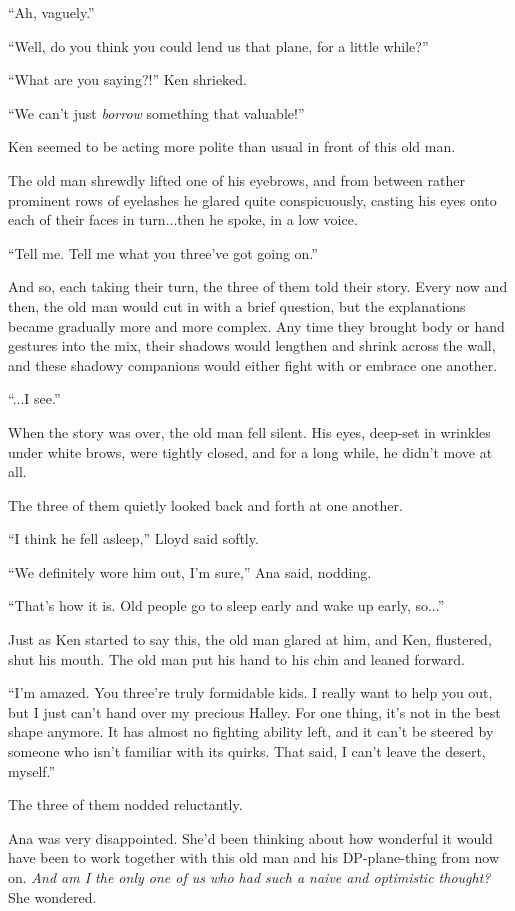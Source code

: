 \documentclass[
]{article}
\begin{document}
``Ah, vaguely.''

``Well, do you think you could lend us that plane, for a little while?''

``What are you saying?!'' Ken shrieked.

``We can't just \emph{borrow} something that valuable!''

Ken seemed to be acting more polite than usual in front of this old man.

The old man shrewdly lifted one of his eyebrows, and from between rather
prominent rows of eyelashes he glared quite conspicuously, casting his
eyes onto each of their faces in turn...then he spoke, in a low voice.

``Tell me. Tell me what you three've got going on.''

And so, each taking their turn, the three of them told their story.
Every now and then, the old man would cut in with a brief question, but
the explanations became gradually more and more complex. Any time they
brought body or hand gestures into the mix, their shadows would lengthen
and shrink across the wall, and these shadowy companions would either
fight with or embrace one another.

``...I see.''

When the story was over, the old man fell silent. His eyes, deep-set in
wrinkles under white brows, were tightly closed, and for a long while,
he didn't move at all.

The three of them quietly looked back and forth at one another.

``I think he fell asleep,'' Lloyd said softly.

``We definitely wore him out, I'm sure,'' Ana said, nodding.

``That's how it is. Old people go to sleep early and wake up early,
so...''

Just as Ken started to say this, the old man glared at him, and Ken,
flustered, shut his mouth. The old man put his hand to his chin and
leaned forward.

``I'm amazed. You three're truly formidable kids. I really want to help
you out, but I just can't hand over my precious Halley. For one thing,
it's not in the best shape anymore. It has almost no fighting ability
left, and it can't be steered by someone who isn't familiar with its
quirks. That said, I can't leave the desert, myself.''

The three of them nodded reluctantly.

Ana was very disappointed. She'd been thinking about how wonderful it
would have been to work together with this old man and his
DP-plane-thing from now on. \emph{And am I the only one of us who had
such a naive and optimistic thought? }She wondered.
\end{document}
